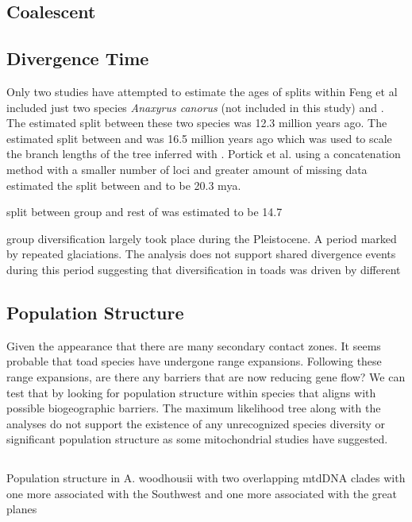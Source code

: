 \subsection{Coalescent}




\subsection{Divergence Time}
Only two studies have attempted to estimate the ages of splits within \anaxyurs 
Feng et al included just two species \textit{Anaxyrus canorus} (not included in this study)
and \punctatus. The estimated split between these two species was 12.3 million years ago.
The estimated split between \incillius and \anaxyrus was 16.5 million years ago 
which was used to scale the branch lengths of the tree inferred with \phycoeval.
Portick et al. using a concatenation method with a smaller number of loci and 
greater amount of missing data estimated the split between \incillius and 
\anaxyrus to be 20.3 mya.

split between \punctatus group and rest of \anaxyrus was estimated to be 14.7 



\amer group diversification largely took place during the Pleistocene.
A period marked by repeated glaciations. 
The \phycoeval analysis does not support shared divergence events during this  
period suggesting that diversification in toads was driven by different 


\subsection{Population Structure}
Given the appearance that there are many secondary contact zones. It seems 
probable that toad species have undergone range expansions. Following these
range expansions, are there any barriers that are now reducing gene flow?
We can test that by looking for population structure within species that 
aligns with possible biogeographic barriers.
The maximum likelihood tree along with the \structure analyses do not support
the existence of any unrecognized species diversity or significant population 
structure as some mitochondrial studies have suggested.



\subsection{}
Population structure in A. woodhousii with two overlapping mtdDNA clades 
with one more associated with the Southwest and one more associated with the 
great planes \parencite{masta2003}

